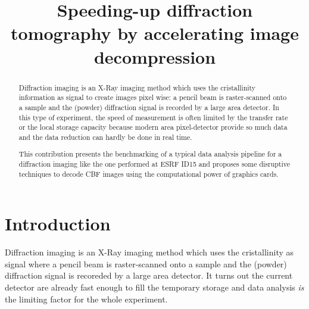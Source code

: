 \documentclass[preprint, pdf]{iucr}              %
\begin{document}

\title{Speeding-up diffraction tomography by accelerating image decompression}

 





\maketitle                        %

\begin{synopsis}
\end{synopsis}

\begin{abstract}

Diffraction imaging is an X-Ray imaging method which uses the cristallinity
information as signal to create images pixel wise: 
a pencil beam is raster-scanned onto a sample and the (powder) diffraction
signal is recorded by a large area detector.
In this type of experiment, the speed of
measurement is often limited by the transfer rate or the local storage capacity
because modern area pixel-detector provide so much data and the data
reduction can hardly be done in real time.

This contribution presents the benchmarking of a typical data
analysis pipeline for a diffraction imaging like the one performed at ESRF ID15
and proposes some disruptive techniques to decode CBF images using the
computational power of graphics cards. 

\end{abstract}


\section{Introduction}

Diffraction imaging is an X-Ray imaging method which uses the cristallinity
as signal where a pencil beam is raster-scanned onto a sample and the
(powder) diffraction signal is recoreded by a large area detector.
It turns out the current detector are already
fast enough to fill the temporary storage and data analysis \emph{is} the
limiting factor for the whole experiment. 
\end{document}
